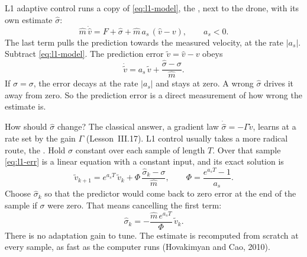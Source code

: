 L1 adaptive control runs a copy of \cref{eq:l1-model}, the , next to the drone, with its own estimate $\hat\sigma$:
\begin{equation}\label{eq:l1-pred}
  \hat m\,\dot{\hat v} = F + \hat\sigma + \hat m\,a_s\,(\hat v - v), \qquad a_s < 0 .
\end{equation}
The last term pulls the prediction towards the measured velocity, at the rate $|a_s|$. Subtract \cref{eq:l1-model}. The prediction error $\tilde v = \hat v - v$ obeys
\begin{equation}\label{eq:l1-err}
  \dot{\tilde v} = a_s\,\tilde v + \frac{\hat\sigma - \sigma}{\hat m} .
\end{equation}
If $\hat\sigma = \sigma$, the error decays at the rate $|a_s|$ and stays at zero. A wrong $\hat\sigma$ drives it away from zero. So the prediction error is a direct measurement of how wrong the estimate is.

How should $\hat\sigma$ change? The classical answer, a gradient law $\dot{\hat\sigma} = -\Gamma\tilde v$, learns at a rate set by the gain $\Gamma$ (Lesson~III.17). L1 control usually takes a more radical route, the . Hold $\hat\sigma$ constant over each sample of length $T$. Over that sample \cref{eq:l1-err} is a linear equation with a constant input, and its exact solution is
\begin{equation}\label{eq:l1-step}
  \tilde v_{k+1} = e^{a_sT}\,\tilde v_k + \Phi\,\frac{\hat\sigma_k - \sigma}{\hat m}, \qquad \Phi = \frac{e^{a_sT} - 1}{a_s} .
\end{equation}
Choose $\hat\sigma_k$ so that the predictor would come back to zero error at the end of the sample if $\sigma$ were zero. That means cancelling the first term:
\begin{equation}\label{eq:l1-law}
  \hat\sigma_k = -\frac{\hat m\,e^{a_sT}}{\Phi}\,\tilde v_k .
\end{equation}
There is no adaptation gain to tune. The estimate is recomputed from scratch at every sample, as fast as the computer runs (Hovakimyan and Cao, 2010).

